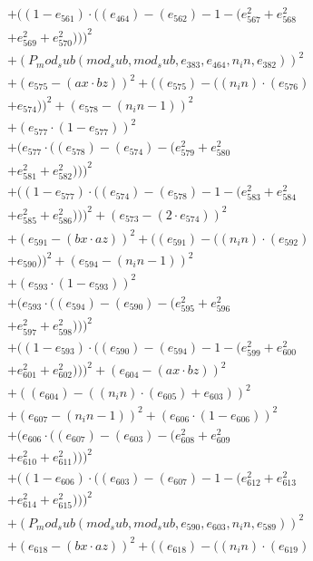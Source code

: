 \documentclass[10pt, a4paper]{article}
\begin{document}
\begin{align*}
& + ((1 - e_{561})  \cdot  ((e_{464}) - (e_{562}) - 1 - (e_{567}^{2} + e_{568}^{2} \\
& + e_{569}^{2} + e_{570}^{2})))^{2} \\
& + (P_mod_sub(mod_sub, mod_sub, e_{383}, e_{464}, n_in, e_{382}))^{2} \\
& + (e_{575} - (ax  \cdot  bz))^{2} + ((e_{575}) - ((n_in)  \cdot  (e_{576}) \\
& + e_{574}))^{2} + (e_{578} - (n_in - 1))^{2} \\
& + (e_{577}  \cdot  (1 - e_{577}))^{2} \\
& + (e_{577}  \cdot  ((e_{578}) - (e_{574}) - (e_{579}^{2} + e_{580}^{2} \\
& + e_{581}^{2} + e_{582}^{2})))^{2} \\
& + ((1 - e_{577})  \cdot  ((e_{574}) - (e_{578}) - 1 - (e_{583}^{2} + e_{584}^{2} \\
& + e_{585}^{2} + e_{586}^{2})))^{2} + (e_{573} - (2  \cdot  e_{574}))^{2} \\
& + (e_{591} - (bx  \cdot  az))^{2} + ((e_{591}) - ((n_in)  \cdot  (e_{592}) \\
& + e_{590}))^{2} + (e_{594} - (n_in - 1))^{2} \\
& + (e_{593}  \cdot  (1 - e_{593}))^{2} \\
& + (e_{593}  \cdot  ((e_{594}) - (e_{590}) - (e_{595}^{2} + e_{596}^{2} \\
& + e_{597}^{2} + e_{598}^{2})))^{2} \\
& + ((1 - e_{593})  \cdot  ((e_{590}) - (e_{594}) - 1 - (e_{599}^{2} + e_{600}^{2} \\
& + e_{601}^{2} + e_{602}^{2})))^{2} + (e_{604} - (ax  \cdot  bz))^{2} \\
& + ((e_{604}) - ((n_in)  \cdot  (e_{605}) + e_{603}))^{2} \\
& + (e_{607} - (n_in - 1))^{2} + (e_{606}  \cdot  (1 - e_{606}))^{2} \\
& + (e_{606}  \cdot  ((e_{607}) - (e_{603}) - (e_{608}^{2} + e_{609}^{2} \\
& + e_{610}^{2} + e_{611}^{2})))^{2} \\
& + ((1 - e_{606})  \cdot  ((e_{603}) - (e_{607}) - 1 - (e_{612}^{2} + e_{613}^{2} \\
& + e_{614}^{2} + e_{615}^{2})))^{2} \\
& + (P_mod_sub(mod_sub, mod_sub, e_{590}, e_{603}, n_in, e_{589}))^{2} \\
& + (e_{618} - (bx  \cdot  az))^{2} + ((e_{618}) - ((n_in)  \cdot  (e_{619}) \\

\end{align*}
\end{document}
